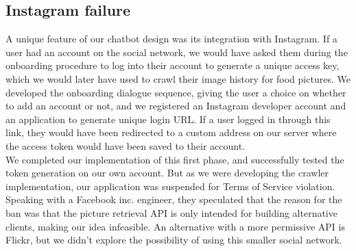 \subsection{Instagram failure}
A unique feature of our chatbot design was its integration with Instagram. If a user had an account on the social network, we would have asked them during the onboarding procedure to log into their account to generate a unique access key, which we would later have used to crawl their image history for food pictures.
We developed the onboarding dialogue sequence, giving the user a choice on whether to add an account or not, and we registered an Instagram developer account and an application to generate unique login URL. If a user logged in through this link, they would have been redirected to a custom address on our server where the access token would have been saved to their account. \\
We completed our implementation of this first phase, and successfully tested the token generation on our own account. But as we were developing the crawler implementation, our application was suspended for Terms of Service violation. Speaking with a Facebook inc. engineer, they speculated that the reason for the ban was that the picture retrieval API is only intended for building alternative clients, making our idea infeasible. An alternative with a more permissive API is Flickr, but we didn't explore the possibility of using this smaller social network.
